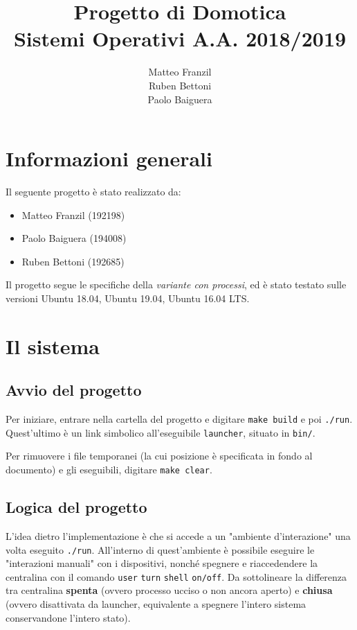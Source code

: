 \documentclass[11pt]{article}
\title{%
Progetto di Domotica \\
  \large Sistemi Operativi A.A. 2018/2019}
\author{Matteo Franzil\\Ruben Bettoni\\Paolo Baiguera}
\begin{document}
\maketitle

\tableofcontents

\newpage

\section{Informazioni generali}

Il seguente progetto è stato realizzato da:
\begin{itemize}
    \item Matteo Franzil (192198)
    \item Paolo Baiguera (194008)
    \item Ruben Bettoni (192685)
\end{itemize}

Il progetto segue le specifiche della \textit{variante con processi}, ed è stato testato sulle versioni Ubuntu 18.04, Ubuntu 19.04, Ubuntu 16.04 LTS.

\section{Il sistema}
\subsection{Avvio del progetto}

Per iniziare, entrare nella cartella del progetto e digitare \verb|make build| e poi \verb|./run|. Quest'ultimo è un link simbolico all'eseguibile \verb|launcher|, situato in \verb|bin/|.

Per rimuovere i file temporanei (la cui posizione è specificata in fondo al documento) e gli eseguibili, digitare \verb|make clear|.

\subsection{Logica del progetto}

L'idea dietro l'implementazione è che si accede a un "ambiente d'interazione" una volta eseguito \verb|./run|. All'interno di quest'ambiente è possibile eseguire le "interazioni manuali" con i dispositivi, nonché spegnere e riaccedendere la centralina con il comando \verb|user| \verb|turn| \verb|shell| \verb|on/off|. Da sottolineare la differenza tra centralina \textbf{spenta} (ovvero processo ucciso o non ancora aperto) e \textbf{chiusa} (ovvero disattivata da launcher, equivalente a spegnere l'intero sistema conservandone l'intero stato).
\end{document}
